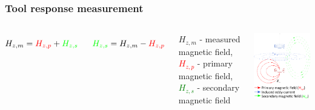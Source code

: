 \documentclass[aspectratio=169]{beamer}
\begin{document}
\begin{frame}
\frametitle{Tool response measurement}


\begin{columns}[c] %

{
\begin{equation}
H_{z,m} =\textcolor{red}{H_{z,p}} + \textcolor{green}{H_{z,s}}
\end{equation}
}

\begin{equation}
\textcolor{green}{H_{z,s}} = H_{z,m} - \textcolor{red}{H_{z,p}}
\end{equation}

\vspace{\baselineskip}
$H_{z,m}$ - measured magnetic field, \textcolor{red}{$H_{z,p}$} - primary magnetic field, \textcolor{green}{$H_{z,s}$} - secondary magnetic field



\includegraphics[scale=0.8]{coils.eps}
\end{columns}

\end{frame}
\end{document}
